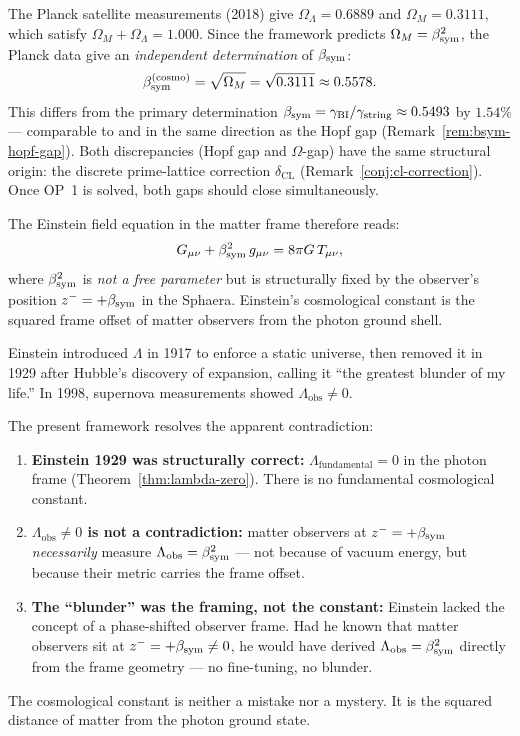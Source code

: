 \begin{remark}
\label{rem:omega-bsym}
The Planck satellite measurements (2018) give $\Omega_\Lambda = 0.6889$
and $\Omega_M = 0.3111$, which satisfy $\Omega_M + \Omega_\Lambda = 1.000$.
Since the framework predicts $\Omega_M = \beta_{\mathrm{sym}}^2$, the Planck data give
an \emph{independent determination} of $\beta_{\mathrm{sym}}$:
\[
  \beta_{\mathrm{sym}}^{(\mathrm{cosmo})}
  = \sqrt{\Omega_M} = \sqrt{0.3111} \approx 0.5578.
\]
This differs from the primary determination
$\beta_{\mathrm{sym}} = \gamma_{\mathrm{BI}}/\gamma_{\mathrm{string}}\approx 0.5493$ by $1.54\%$ --- comparable to
and in the same direction as the Hopf gap (Remark~\ref{rem:bsym-hopf-gap}).
Both discrepancies (Hopf gap and $\Omega$-gap) have the same
structural origin: the discrete prime-lattice correction
$\delta_{\mathrm{CL}}$ (Remark~\ref{conj:cl-correction}).
Once OP~1 is solved, both gaps should close simultaneously.

\medskip
\noindent The Einstein field equation in the matter frame therefore reads:
\[
  G_{\mu\nu} + \beta_{\mathrm{sym}}^2\,g_{\mu\nu} = 8\pi G\,T_{\mu\nu},
\]
where $\beta_{\mathrm{sym}}^2$ is \emph{not a free parameter} but is structurally
fixed by the observer's position $z^- = +\beta_{\mathrm{sym}}$ in the Sphaera.
Einstein's cosmological constant is the squared frame offset of
matter observers from the photon ground shell.
\end{remark}

\begin{remark}
\label{rem:einstein-blunder}
Einstein introduced $\Lambda$ in 1917 to enforce a static universe,
then removed it in 1929 after Hubble's discovery of expansion, calling
it ``the greatest blunder of my life.'' In 1998, supernova measurements
showed $\Lambda_{\mathrm{obs}} \neq 0$.

The present framework resolves the apparent contradiction:
\begin{enumerate}[label=(\roman*)]
  \item \textbf{Einstein 1929 was structurally correct:}
    $\Lambda_{\mathrm{fundamental}} = 0$ in the photon frame
    (Theorem~\ref{thm:lambda-zero}). There is no fundamental
    cosmological constant.
  \item \textbf{$\Lambda_{\mathrm{obs}} \neq 0$ is not a contradiction:}
    matter observers at $z^- = +\beta_{\mathrm{sym}}$ \emph{necessarily} measure
    $\Lambda_{\mathrm{obs}} = \beta_{\mathrm{sym}}^2$ --- not because of vacuum energy,
    but because their metric carries the frame offset.
  \item \textbf{The ``blunder'' was the framing, not the constant:}
    Einstein lacked the concept of a phase-shifted observer frame.
    Had he known that matter observers sit at $z^- = +\beta_{\mathrm{sym}} \neq 0$,
    he would have derived $\Lambda_{\mathrm{obs}} = \beta_{\mathrm{sym}}^2$ directly
    from the frame geometry --- no fine-tuning, no blunder.
\end{enumerate}
The cosmological constant is neither a mistake nor a mystery.
It is the squared distance of matter from the photon ground state.
\end{remark}



